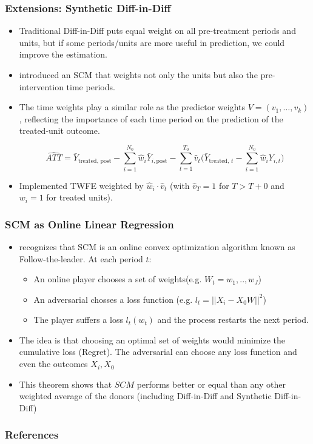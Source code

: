 \documentclass[xcolor=svgnames,t]{beamer}
\newcommand{\myitem}{\item[$\circ$]}
\begin{document}
\begin{frame}
    \frametitle{Extensions: Synthetic Diff-in-Diff}
    \begin{itemize}
        \item<1-> Traditional Diff-in-Diff puts equal weight on all pre-treatment periods and units, but if some periods/units are more useful in prediction, we could improve the estimation.
        \item<2-> \cite{arkhangelsky2021synthetic} introduced an SCM that weights not only the units but also the pre-intervention time periods.
        \item<3-> The time weights play a similar role as the predictor weights $V = (v_1, \dots, v_k)$, reflecting the importance of each time period on the prediction of the treated-unit outcome.
        
        \[
        \hat{ATT} = \bar{Y}_{\text{treated, post}} - \sum_{i=1}^{N_0} \hat{w}_i \bar{Y}_{i, \text{post}} - \sum_{t=1}^{T_0} \hat{v}_t \Bigg(\bar{Y}_{\text{treated, } t} - \sum_{i=1}^{N_0} \hat{w}_i Y_{i, t}\Bigg)
        \]
        
        \item<4-> Implemented TWFE weighted by $\hat{w}_i \cdot \hat{v}_t$ (with $\hat{v}_T = 1$ for $T > T+0$ and $w_i = 1$ for treated units).
    \end{itemize}
\end{frame}


\begin{frame}
    \frametitle{SCM as Online Linear Regression }
    \begin{itemize}
        \item<1-> \cite{chen2023synthetic} recognizes that SCM is an online convex optimization algorithm known as Follow-the-leader. At each period $t$:
        \begin{itemize}
            \myitem An online player chooses a set of weights(e.g. $W_t=w_1,..,w_J$)
            \myitem An adversarial chosses a loss function (e.g. $l_t=||X_i-X_0 W ||^2$)
            \myitem The player suffers a loss $l_t(w_t)$ and the process restarts the next period.
        \end{itemize}
        \item <2-> The idea is that choosing an optimal set of weights would minimize the cumulative loss (Regret). The adversarial can choose any loss function and even the outcomes $X_i, X_0$
            \item <4-> This theorem shows that $SCM$ performs better or equal than any other weighted average of the donors (including Diff-in-Diff and Synthetic Diff-in-Diff)
    \end{itemize}
    

\end{frame}



\begin{frame} [allowframebreaks]\frametitle{References}
               
    
    
\end{frame}
\end{document}
